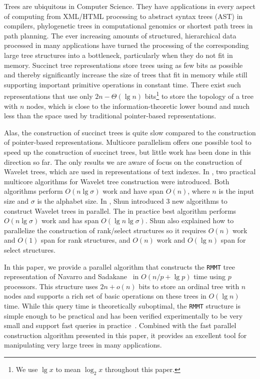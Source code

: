 Trees are ubiquitous in Computer Science.
They have applications in every aspect of computing from XML/HTML
processing to abstract syntax trees (AST) in compilers, phylogenetic trees in
computational genomics or shortest path trees in path planning.
The ever increasing amounts of structured, hierarchical data processed in
many applications have turned the processing of the corresponding large tree
structures into a bottleneck, particularly when they do not fit in memory.
Succinct tree representations store trees using as few bits as possible and
thereby significantly increase the size of trees that fit in memory while
still supporting important primitive operations in constant time.
There exist such representations that use only
$2n - \Theta(\lg n)$ bits\footnote{We use $\lg x$ to mean
  $\log_{2}x$ throughout this paper.} to store the topology of a tree with $n$
nodes, which is close to the information-theoretic lower bound and much less
than the space used by traditional pointer-based representations.

Alas, the construction of succinct trees is quite slow compared to the
construction of pointer-based representations.
Multicore parallelism offers one possible tool to speed up the construction
of succinct trees, but little work has been done in this direction so far.
The only results we are aware of focus on the construction of Wavelet trees,
which are used in representations of text indexes.
In \cite{Fuentes2014}, two practical multicore algorithms
for Wavelet tree construction were introduced.
Both algorithms perform $O(n\lg \sigma)$ work and have span $O(n)$, where $n$
is the input size and $\sigma$ is the alphabet size.
In \cite{DBLP:journals/corr/Shun14}, Shun introduced 3 new algorithms to
construct Wavelet trees in parallel.
The in practice best algorithm performs $O(n\lg \sigma)$ work and has span
$O(\lg n\lg \sigma)$.
Shun also explained how to parallelize the construction of
rank/select structures so it requires $O(n)$ work and $O(1)$ span for rank
structures, and $O(n)$ work and $O(\lg n)$ span for select structures.

In this paper, we provide a parallel algorithm that constructs the {\tt RMMT}
tree representation of Navarro and
Sadakane~\cite{Navarro:2014:FFS:2620785.2601073} in $O(n/p + \lg p)$ time using
$p$ processors.
This structure uses $2n + o(n)$ bits to store an ordinal tree with $n$ nodes
and supports a rich set of basic operations on these trees in $O(\lg n)$ time.
While this query time is theoretically suboptimal, the {\tt RMMT} structure is
simple enough to be practical and has been verified experimentally to be very
small and support fast queries in practice~\cite{ACNSalenex10}.
Combined with the fast parallel construction algorithm presented in this
paper, it provides an excellent tool for manipulating very large trees in
many applications.

